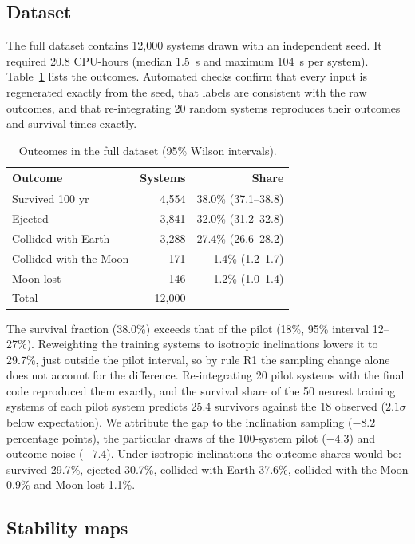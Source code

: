 \documentclass[twocolumn]{aastex631}
\begin{document}
\subsection{Dataset}

The full dataset contains 12,000 systems drawn with an independent seed. It required 20.8
CPU-hours (median 1.5~s and maximum 104~s per system). Table~\ref{tab:outcomes} lists the
outcomes. Automated checks confirm that every input is regenerated exactly from the seed, that
labels are consistent with the raw outcomes, and that re-integrating 20 random systems reproduces
their outcomes and survival times exactly.

\begin{table}
\caption{Outcomes in the full dataset (95\% Wilson intervals). \label{tab:outcomes}}
\centering
\small
\setlength{\tabcolsep}{4pt}
\begin{tabular}{lrr}
\hline
Outcome & Systems & Share \\
\hline
Survived 100 yr & 4,554 & 38.0\% (37.1--38.8) \\
Ejected & 3,841 & 32.0\% (31.2--32.8) \\
Collided with Earth & 3,288 & 27.4\% (26.6--28.2) \\
Collided with the Moon & 171 & 1.4\% (1.2--1.7) \\
Moon lost & 146 & 1.2\% (1.0--1.4) \\
\hline
Total & 12,000 & \\
\hline
\end{tabular}
\end{table}

The survival fraction (38.0\%) exceeds that of the pilot (18\%, 95\% interval 12--27\%).
Reweighting the training systems to isotropic inclinations lowers it to 29.7\%, just outside the
pilot interval, so by rule R1 the sampling change alone does not account for the difference.
Re-integrating 20 pilot systems with the final code reproduced them exactly, and the survival
share of the 50 nearest training systems of each pilot system predicts 25.4 survivors against the
18 observed ($2.1\sigma$ below expectation). We attribute the gap to the inclination sampling
($-8.2$ percentage points), the particular draws of the 100-system pilot ($-4.3$) and outcome
noise ($-7.4$). Under isotropic inclinations the outcome shares would be: survived 29.7\%,
ejected 30.7\%, collided with Earth 37.6\%, collided with the Moon 0.9\% and Moon lost 1.1\%.

\subsection{Stability maps} \label{sec:maps}
\end{document}
